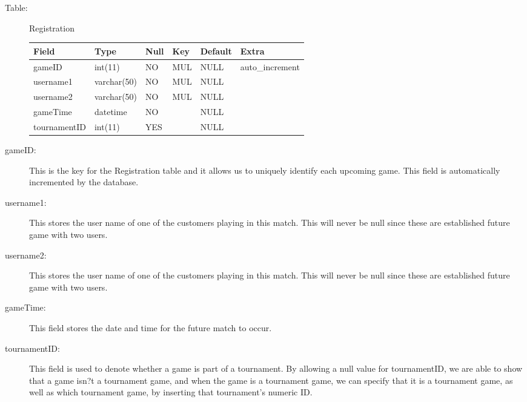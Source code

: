 			\begin{description}
				\item[Table:] Registration
				
				\begin{center}
					\begin{tabular}{ | l | l | l | l | l | l|}
						\hline
						Field & Type & Null & Key & Default & Extra \\ \hline \hline
						gameID & int(11) & NO & MUL & NULL & auto\_increment \\ \hline
						username1 & varchar(50) & NO & MUL & NULL &\hspace{1 pc}  \\ \hline
						username2 & varchar(50) & NO & MUL& NULL &\hspace{1 pc}  \\ \hline
						gameTime & datetime & NO &\hspace{1 pc} & NULL &\hspace{1 pc}  \\ \hline
						tournamentID & int(11) & YES &\hspace{1 pc} & NULL &\hspace{1 pc}   \\
						\hline
					\end{tabular}
				\end{center}

				\item[gameID:] This is the key for the Registration table and it allows us to uniquely identify each upcoming game. This field is automatically incremented by the database.
				\item[username1:] This stores the user name of one of the customers playing in this match. This will never be null since these are established future game with two users.
				\item[username2:] This stores the user name of one of the customers playing in this match. This will never be null since these are established future game with two users.
				\item[gameTime:] This field stores the date and time for the future match to occur.
				\item[tournamentID:] This field is used to denote whether a game is part of a tournament. By allowing a null value for tournamentID, we are able to show that a game isn?t a tournament game, and when the game is a tournament game, we can specify that it is a tournament game, as well as  which tournament game, by inserting that tournament's numeric ID.
			\end{description}

